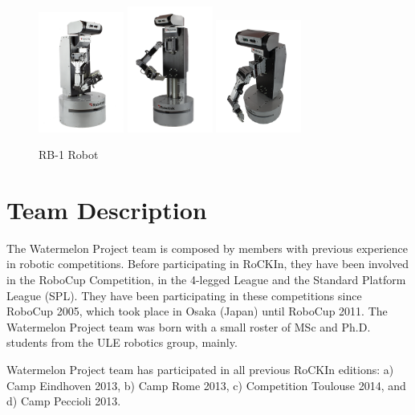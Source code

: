 \documentclass[conference]{IEEEtran}
\begin{document}
\begin{figure}[t!]
  \centering
  \includegraphics[width=0.25\textwidth]{21113}
  \includegraphics[width=0.25\textwidth]{31177}
  \includegraphics[width=0.25\textwidth]{91195}
  \caption{RB-1 Robot} 
  \label{fig:robots}
\end{figure}


\section{Team Description}
\label{sec:teamdescription}

The Watermelon Project team is composed by members with previous experience in robotic competitions. 
Before participating in RoCKIn, they have been involved in the RoboCup Competition, in the 4-legged League and the Standard Platform League (SPL). 
They have been participating in these competitions since RoboCup 2005, which took place in Osaka (Japan) until RoboCup 2011.
The Watermelon Project team was born with a small roster of MSc and Ph.D. students from the ULE robotics group, mainly.

Watermelon Project team has participated in all previous RoCKIn editions: a) Camp Eindhoven 2013,  b) Camp Rome 2013, c) Competition Toulouse 2014, and d) Camp Peccioli 2013.
\end{document}
